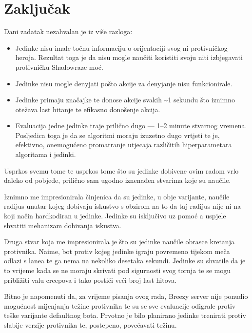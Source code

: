 \documentclass[times, utf8, zavrsni, numeric]{fer}
\begin{document}
\chapter{Zaključak}\label{chapter:zakljucak}

Dani zadatak nezahvalan je iz više razloga:
\begin{itemize}
    \item Jedinke nisu imale točnu informaciju o orijentaciji svog ni
        protivničkog heroja. Rezultat toga je da nisu mogle naučiti koristiti
        svoju niti izbjegavati protivničku Shadowraze moć.
    \item Jedinke nisu mogle denyjati pošto akcije za denyjanje nisu
        funkcionirale.
    \item Jedinke primaju značajke te donose akcije svakih \textasciitilde1
        sekundu što iznimno otežava last hitanje te efikasno donošenje akcija.
    \item Evaluacija jedne jedinke traje prilično dugo --- 1--2 minute stvarnog
        vremena. Posljedica toga je da se algoritmi moraju izuzetno dugo vrtjeti
        te je, efektivno, onemogućeno promatranje utjecaja različitih
        hiperparametara algoritama i jedinki.
\end{itemize}

Usprkos svemu tome te usprkos tome što su jedinke dobivene ovim radom vrlo
daleko od pobjede, prilično sam ugodno iznenađen stvarima koje su naučile.

Iznimno me impresionirala činjenica da su jedinke, u obje varijante, naučile
radijus unutar kojeg dobivaju iskustvo s obzirom na to da taj radijus nije ni na
koji način hardkodiran u jedinke. Jedinke su isključivo uz pomoć
a uspjele shvatiti mehanizam dobivanja iskustva.

Druga stvar koja me impresionirala je što su jedinke naučile obrasce kretanja
protivnika. Naime, bot protiv kojeg jedinke igraju povremeno tijekom meča odlazi
s lanea te ga nema na nekoliko desetaka sekundi. Jedinke su shvatile da je to
vrijeme kada se ne moraju skrivati pod sigurnosti svog tornja te se mogu
približiti valu creepova i tako postići veći broj last hitova.

Bitno je napomenuti da, za vrijeme pisanja ovog rada, Breezy server nije ponudio
mogućnost mijenjanja težine protivnika te su se sve evaluacije odigrale protiv
teške  varijante defaultnog bota. Prvotno je bilo planirano jedinke
trenirati protiv slabije verzije protivnika te, postepeno, povećavati težinu.
\end{document}
